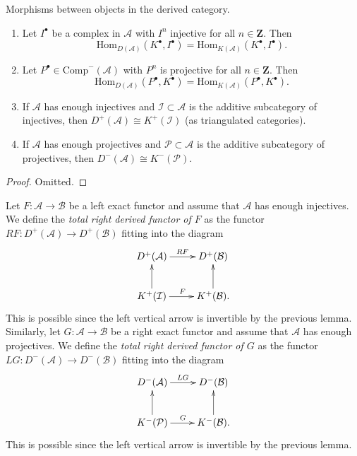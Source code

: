\begin{lemma}
\label{lemma-derived-categories}
Morphisms between objects in the derived category.
\begin{enumerate}
\item
Let $I^\bullet$ be a complex in $\mathcal{A}$ with $I^n$ injective for all $n
\in \mathbf{Z}$. Then
$$
\text{Hom}_{D(\mathcal{A})}(K^\bullet, I^\bullet)
=
\text{Hom}_{K(\mathcal{A})}(K^\bullet, I^\bullet).
$$
\item
Let $P^\bullet \in \text{Comp}^-(\mathcal{A})$ with $P^n$ is projective for all
$n \in \mathbf{Z}$. Then
$$
\text{Hom}_{D(\mathcal{A})}(P^\bullet, K^\bullet)
=
\text{Hom}_{K(\mathcal{A})}(P^\bullet, K^\bullet).
$$
\item
If $\mathcal{A}$ has enough injectives and $\mathcal{I} \subset \mathcal{A}$
is the additive subcategory of injectives, then
$
D^+(\mathcal{A})\cong K^+(\mathcal{I})
$
(as triangulated categories).
\item
If $\mathcal{A}$ has enough projectives and $\mathcal{P} \subset \mathcal{A}$
is the additive subcategory of projectives, then
$
D^-(\mathcal{A}) \cong K^-(\mathcal{P}).
$
\end{enumerate}
\end{lemma}

\begin{proof}
Omitted.
\end{proof}

\begin{definition}
\label{definition-derived-functor}
Let $F: \mathcal{A} \to \mathcal{B}$ be a left exact functor and assume that
$\mathcal{A}$ has enough injectives. We define the {\it total right derived
functor of $F$} as the functor $RF: D^+(\mathcal{A}) \to D^+(\mathcal{B})$
fitting into the diagram
$$
\xymatrix{
D^+(\mathcal{A}) \ar[r]^{RF} & D^+(\mathcal{B}) \\
K^+(\mathcal I) \ar[u] \ar[r]^F & K^+(\mathcal{B}). \ar[u]
}
$$
This is possible since the left vertical arrow is invertible by the previous
lemma. Similarly, let $G: \mathcal{A} \to \mathcal{B}$ be a right exact
functor and assume that $\mathcal{A}$ has enough projectives. We define the
{\it total right derived functor of $G$} as the functor $LG: D^-(\mathcal{A})
\to D^-(\mathcal{B})$ fitting into the diagram
$$
\xymatrix{
D^-(\mathcal{A}) \ar[r]^{LG} & D^-(\mathcal{B}) \\
K^-(\mathcal{P}) \ar[u] \ar[r]^G & K^-(\mathcal{B}). \ar[u]
}
$$
This is possible since the left vertical arrow is invertible by the previous
lemma.
\end{definition}

